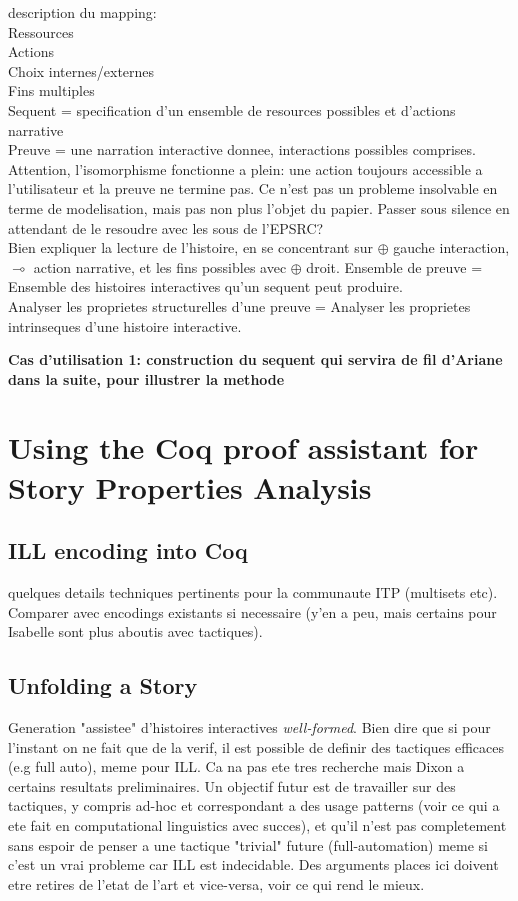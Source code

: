 \documentclass[runningheads,a4paper]{llncs}
\begin{document}
description du mapping:\\
Ressources\\
Actions\\
Choix internes/externes\\
Fins multiples\\
Sequent = specification d'un ensemble de resources possibles et d'actions narrative\\
Preuve = une narration interactive donnee, interactions possibles comprises. Attention, l'isomorphisme fonctionne a plein: une
action toujours accessible a l'utilisateur et la preuve ne termine pas. Ce n'est pas un probleme insolvable en terme de modelisation, mais pas non plus l'objet du papier. Passer sous silence en attendant de le resoudre avec les sous de l'EPSRC?\\
Bien expliquer la lecture de l'histoire, en se concentrant sur $\oplus$ gauche interaction, $\multimap$ action narrative, et les fins possibles avec $\oplus$ droit.
Ensemble de preuve = Ensemble des histoires interactives qu'un sequent peut produire.\\

Analyser les proprietes structurelles d'une preuve = Analyser les proprietes intrinseques d'une histoire interactive.

\textbf{Cas d'utilisation 1: construction du sequent qui servira de fil d'Ariane dans la suite, pour illustrer la methode}
\section{Using the Coq proof assistant for Story Properties Analysis}
\subsection{ILL encoding into Coq}
quelques details techniques pertinents pour la communaute ITP (multisets etc). Comparer avec encodings existants si necessaire (y'en a peu, mais certains pour Isabelle sont plus aboutis avec tactiques).
\subsection{Unfolding a Story}
Generation "assistee" d'histoires interactives \emph{well-formed}. Bien dire que si pour l'instant on ne fait que de la verif, il est possible de definir des tactiques efficaces (e.g full auto), meme pour ILL. Ca na pas ete tres recherche mais Dixon a certains resultats preliminaires. Un objectif futur est de travailler sur des tactiques, y compris ad-hoc et correspondant a des usage patterns (voir ce qui a ete fait en computational linguistics avec succes), et qu'il n'est pas completement sans espoir de penser a une tactique "trivial" future (full-automation) meme si c'est un vrai probleme car ILL est indecidable. Des arguments places ici doivent etre retires de l'etat de l'art et vice-versa, voir ce qui rend le mieux.
\end{document}
